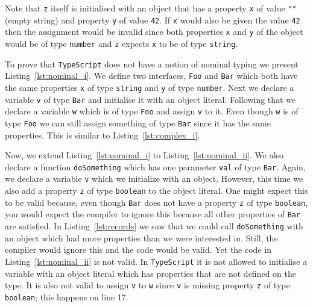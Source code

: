 \documentclass{article}
\newcommand{\ttt}[1]{\texttt{#1}}
\begin{document}
Note that \ttt{z} itself is initialised with an object that has a property \ttt{x} of value \ttt{""} (empty string) and property \ttt{y} of value \ttt{42}.
If \ttt{x} would also be given the value \ttt{42} then the assignment would be invalid since both properties \ttt{x} and \ttt{y} of the object would be of type \ttt{number} and \ttt{z} expects \ttt{x} to be of type \ttt{string}.

\begin{center}
    \begin{minipage}{.75\textwidth}
    
    \end{minipage}
\end{center}
To prove that \ttt{TypeScript} does not have a notion of nominal typing we present Listing~\ref{lst:nominal_i}.
We define two interfaces, \ttt{Foo} and \ttt{Bar} which both have the same properties \ttt{x} of type \ttt{string} and \ttt{y} of type \ttt{number}.
Next we declare a variable \ttt{v} of type \ttt{Bar} and initialise it with an object literal.
Following that we declare a variable \ttt{w} which is of type \ttt{Foo} and assign \ttt{v} to it.
Even though \ttt{w} is of type \ttt{Foo} we can still assign something of type \ttt{Bar} since it has the same properties.
This is similar to Listing~\ref{lst:complex_i}.

\begin{center}
    \begin{minipage}{.75\textwidth}
    
    \end{minipage}
\end{center}

Now, we extend Listing~\ref{lst:nominal_i} to Listing~\ref{lst:nominal_ii}.
We also declare a function \ttt{doSomething} which has one parameter \ttt{val} of type \ttt{Bar}.
Again, we declare a variable \ttt{v} which we initialize with an object.
However, this time we also add a property \ttt{z} of type \ttt{boolean} to the object literal.
One might expect this to be valid because, even though \ttt{Bar} does not have a property \ttt{z} of type \ttt{boolean}, you would expect the compiler to ignore this because all other properties of \ttt{Bar} are satisfied.
In Listing~\ref{lst:records} we saw that we could call \ttt{doSomething} with an object which had more properties than we were interested in.
Still, the compiler would ignore this and the code would be valid.
Yet the code in Listing~\ref{lst:nominal_ii} is not valid.
In \ttt{TypeScript} it is not allowed to initialise a variable with an object literal which has properties that are not defined on the type.
It is also not valid to assign \ttt{v} to \ttt{w} since \ttt{v} is missing property \ttt{z} of type \ttt{boolean}; this happens on line 17. 
\end{document}
